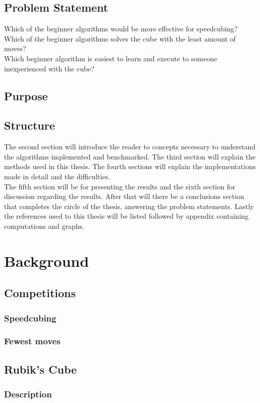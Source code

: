 \documentclass[a4paper,11pt]{kth-mag}
\begin{document}
\section{Problem Statement}
Which of the beginner algorithms would be more effective for speedcubing?\\
Which of the beginner algorithms solves the cube with the least amount of moves?\\
Which beginner algorithm is easiest to learn and execute to someone inexperienced with the cube?\\
\section{Purpose}
\section{Structure}
The second section will introduce the reader to concepts necessary to understand the algorithms implemented and benchmarked. The third section will explain the methods used in this thesis. The fourth sections will explain the implementations made in detail and the difficulties.\\
The fifth section will be for presenting the results and the sixth section for discussion regarding the results. After that will there be a conclusions section that completes the circle of the thesis, answering the problem statements. Lastly the references used to this thesis will be listed followed by appendix containing computations and graphs.   


\chapter{Background}
\section{Competitions}
\subsection{Speedcubing}
\subsection{Fewest moves}
\section{Rubik's Cube}
\subsection{Description}
\end{document}
